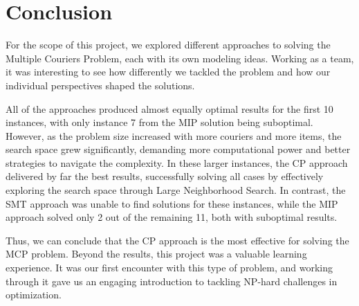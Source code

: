 \section{Conclusion} 
For the scope of this project, we explored different approaches to solving the Multiple Couriers Problem, each with its own modeling ideas. Working as a team, it was interesting to see how differently we tackled the problem and how our individual perspectives shaped the solutions.

All of the approaches produced almost equally optimal results for the first 10 instances, with only instance 7 from the MIP solution being suboptimal. However, as the problem size increased with more couriers and more items, the search space grew significantly, demanding more computational power and better strategies to navigate the complexity. In these larger instances, the CP approach delivered by far the best results, successfully solving all cases by effectively exploring the search space through Large Neighborhood Search. In contrast, the SMT approach was unable to find solutions for these instances, while the MIP approach solved only 2 out of the remaining 11, both with suboptimal results.

Thus, we can conclude that the CP approach is the most effective for solving the MCP problem. Beyond the results, this project was a valuable learning experience. It was our first encounter with this type of problem, and working through it gave us an engaging introduction to tackling NP-hard challenges in optimization.







